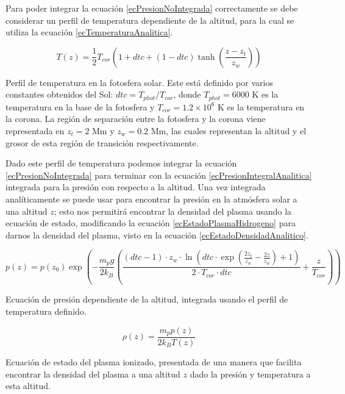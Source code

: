 Para poder integrar la ecuación \ref{ecPresionNoIntegrada} correctamente se debe
considerar un perfil de temperatura dependiente de la altitud, para la cual se
utiliza la ecuación \ref{ecTemperaturaAnalitica}.

\begin{equ}[!ht]
	\begin{equation} \label{ecTemperaturaAnalitica}
		T(z) = \frac{1}{2} T_{cor} \left(1 + dtc + \left(1 - dtc\right) \tanh \left(\frac{z - z_t}{z_w}\right)\right)
	\end{equation}
	\caption{Perfil de temperatura en la fotosfera solar. Este está definido por
	varios constantes obtenidos del Sol: \(dtc = T_{phot} / T_{cor}\), donde
	\(T_{phot} = 6000 \textrm{ K}\) es la temperatura en la base de la fotosfera
	y \(T_{cor} = 1.2 \times 10^6 \textrm{ K}\) es la temperatura en la corona.
	La región de separación entre la fotosfera y la corona viene representada en
	\(z_t = 2 \textrm{ Mm}\) y \(z_w = 0.2 \textrm{ Mm}\), las cuales
	representan la altitud y el grosor de esta región de transición
	respectivamente. \cite{newtonianCafe}} 
\end{equ}

Dado este perfil de temperatura podemos integrar la ecuación
\ref{ecPresionNoIntegrada} para terminar con la ecuación
\ref{ecPresionIntegralAnalitica} integrada para la presión con respecto a la
altitud. Una vez integrada analíticamente se puede usar para encontrar la
presión en la atmósfera solar a una altitud \(z\); esto nos permitirá encontrar
la densidad del plasma usando la ecuación de estado, modificando la ecuación
\ref{ecEstadoPlasmaHidrogeno} para darnos la densidad del plasma, visto en la
ecuación \ref{ecEstadoDensidadAnalitico}.

\begin{equ}[!ht]
	\begin{equation} \label{ecPresionIntegralAnalitica}
		p(z) = p(z_0) \exp \left(
			- \frac{m_p g}{2 k_B} 
			\left(
				\frac{
					\left(dtc - 1\right) \cdot z_w \cdot
					\ln \left(
						dtc \cdot 
						\exp \left(
							\frac{2 z_t}{z_w} - \frac{2 z}{z_w}
						\right) + 1
					\right) 
				}{
					2 \cdot T_{cor} \cdot dtc
				}
				+ \frac{z}{T_{cor}}
			\right)
		\right)
	\end{equation}
	\caption{Ecuación de presión dependiente de la altitud, integrada usando el perfil de temperatura definido.}
\end{equ}

\begin{equ}[!ht]
	\begin{equation} \label{ecEstadoDensidadAnalitico}
		\rho (z) = \frac{m_p p(z)}{2 k_B T(z)}
	\end{equation}
	\caption{Ecuación de estado del plasma ionizado, presentada de una manera
	que facilita encontrar la densidad del plasma a una altitud \(z\) dado la
	presión y temperatura a esta altitud. \cite{newtonianCafe}}
\end{equ}

